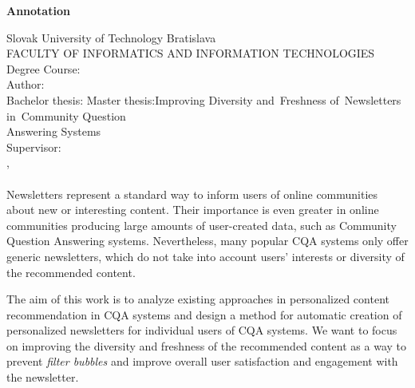\afterpage{\blankpage}
\newpage
\thispagestyle{plain}
\begin{center}
\begin{Large}
\textbf{Annotation} \\
\end{Large}
\end{center}
Slovak University of Technology Bratislava
\vspace*{2mm}\\FACULTY OF INFORMATICS AND INFORMATION TECHNOLOGIES
\vspace*{2mm}\\
\noindent
Degree Course:~\ProgramEN
\vspace*{2mm}\\
\noindent
Author:\hspace*{14.5mm}\Author
\vspace*{2mm}\\
{
	{Bachelor thesis: }\TitleEN
}
{
	{Master thesis:\hspace*{4mm}}Improving Diversity and~Freshness of~Newsletters in~Community Question\\
    \hspace*{27.5mm}Answering Systems
}
\vspace*{2mm}\\
Supervisor: \hspace*{7mm}\Supervisor
\vspace*{2mm}\\\Year, \MonthEN\\
\noindent
\\
Newsletters represent a standard way to inform users of online communities about new or interesting content.
Their importance is even greater in online communities producing large amounts of user-created data, such as
Community Question Answering systems.
Nevertheless, many popular CQA systems only offer generic newsletters, which do not take into account users’ interests
or diversity of the recommended content.

The aim of this work is to analyze existing approaches in personalized content recommendation in CQA systems and design a method for automatic
creation of personalized newsletters for individual users of CQA systems. We want to focus on improving the diversity and freshness of the
recommended content as a way to prevent \emph{filter bubbles} and improve overall user satisfaction and engagement with the newsletter.

\afterpage{\blankpage}
